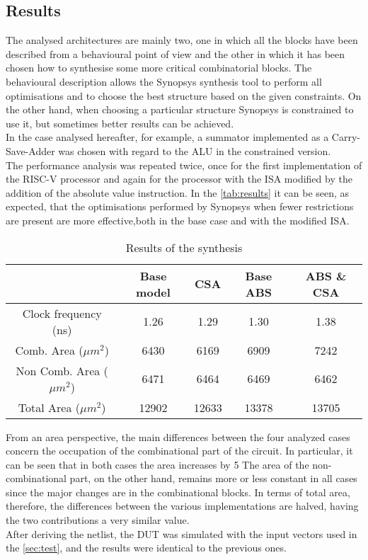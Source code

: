 \subsection{Results}
The analysed architectures are mainly two, one in which all the blocks have been described from a behavioural point of view and the other in which it has been chosen how to synthesise some more critical combinatorial blocks. The behavioural description allows the Synopsys synthesis tool to perform all optimisations and to choose the best structure based on the given constraints. On the other hand, when choosing a particular structure Synopsys is constrained to use it, but sometimes better results can be achieved.\\
In the case analysed hereafter, for example, a summator implemented as a Carry-Save-Adder was chosen with regard to the ALU in the constrained version.\\
The performance analysis was repeated twice, once for the first implementation of the RISC-V processor and again for the processor with the ISA modified by the addition of the absolute value instruction. In the \autoref{tab:results} it can be seen, as expected, that the optimisations performed by Synopsys when fewer restrictions are present are more effective,both in the base case and with the modified ISA.\\
\begin{table}[H]
	\centering
	\begin{tabular}{c|c|c||c|c}
		& Base model & CSA & Base ABS & ABS  \& CSA \\
		\hline
		Clock frequency (ns) & 1.26 & 1.29 & 1.30 & 1.38 \\
		Comb. Area ($\mu m^2$) & 6430 & 6169 & 6909 & 7242 \\
		Non Comb. Area ($\mu m^2$) & 6471 & 6464 & 6469 & 6462 \\
		Total Area ($\mu m^2$)	& 12902 & 12633 & 13378 & 13705\\
	\end{tabular}
	\caption{Results of the synthesis}
	\label{tab:results}
\end{table}

\noindent From an area perspective, the main differences between the four analyzed cases concern the occupation of the combinational part of the circuit. In particular, it can be seen that in both cases the area increases by 5%
The area of the non-combinational part, on the other hand, remains more or less constant in all cases since the major changes are in the combinational blocks. In terms of total area, therefore, the differences between the various implementations are halved, having the two contributions a very similar value.\\
After deriving the netlist, the DUT was simulated with the input vectors used in the \autoref{sec:test}, and the results were identical to the previous ones. 